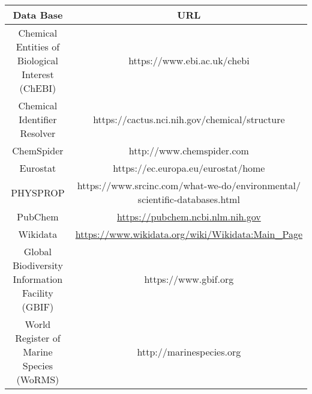 \begin{tabular}{cc}
  \hline
  Data Base & URL \\ 
  \hline
  \makecell{Chemical Entities of \\ Biological Interest (ChEBI)} & https://www.ebi.ac.uk/chebi  \\
  Chemical Identifier Resolver & https://cactus.nci.nih.gov/chemical/structure  \\[0.5cm]
  ChemSpider & http://www.chemspider.com    \\[0.5cm]
  Eurostat & https://ec.europa.eu/eurostat/home \\[0.5cm]
  PHYSPROP & \makecell{https://www.srcinc.com/what-we-do/environmental/\\scientific-databases.html}  \\[0.5cm]
  PubChem & \url{https://pubchem.ncbi.nlm.nih.gov} \\[0.5cm]
  Wikidata & \url{https://www.wikidata.org/wiki/Wikidata:Main_Page} \\[0.5cm]
  \makecell{Global Biodiversity \\ Information Facility (GBIF)} & https://www.gbif.org \\[0.5cm]
  \makecell{World Register of \\ Marine Species (WoRMS)} & http://marinespecies.org \\
  \hline
\end{tabular}

